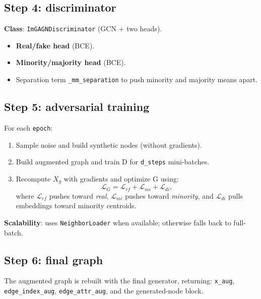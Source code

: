 \subsection{Step 4: discriminator}
\textbf{Class}: \texttt{ImGAGNDiscriminator} (GCN + two heads).
\begin{itemize}[leftmargin=*]
  \item \textbf{Real/fake head} (BCE).
  \item \textbf{Minority/majority head} (BCE).
  \item Separation term \texttt{\_mm\_separation} to push minority and majority means apart.
\end{itemize}

\subsection{Step 5: adversarial training}
For each \texttt{epoch}:
\begin{enumerate}[leftmargin=*]
  \item Sample noise and build synthetic nodes (without gradients).
  \item Build augmented graph and train D for \texttt{d\_steps} mini-batches.
  \item Recompute $X_g$ with gradients and optimize G using:
  \[
  \mathcal{L}_G = \mathcal{L}_{rf} + \mathcal{L}_{mi} + \mathcal{L}_{di},
  \]
  where $\mathcal{L}_{rf}$ pushes toward \emph{real}, $\mathcal{L}_{mi}$ pushes toward \emph{minority}, and $\mathcal{L}_{di}$ pulls embeddings toward minority centroids.
\end{enumerate}
\textbf{Scalability}: uses \texttt{NeighborLoader} when available; otherwise falls back to full-batch.

\subsection{Step 6: final graph}
The augmented graph is rebuilt with the final generator, returning:
\texttt{x\_aug}, \texttt{edge\_index\_aug}, \texttt{edge\_attr\_aug}, and the generated-node block.

